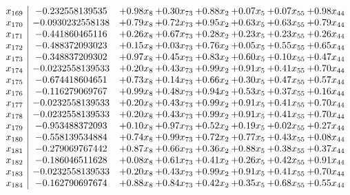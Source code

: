 \documentclass[8pt]{article}
\begin{document}
\[\begin{array}{c| c c@{\hskip 2pt} c@{\hskip 2pt} c@{\hskip 2pt} c@{\hskip 2pt} c@{\hskip 2pt} c@{\hskip 2pt} }
 x_{169}   &  -0.232558139535 & +  0.98 x_{8} & +  0.30 x_{73} & +  0.88 x_{2} & +  0.07 x_{5} & +  0.07 x_{55} & +  0.98 x_{44}\\
 x_{170}   &  -0.0930232558138 & +  0.79 x_{8} & +  0.72 x_{73} & +  0.95 x_{2} & +  0.63 x_{5} & +  0.63 x_{55} & +  0.79 x_{44}\\
 x_{171}   &  -0.441860465116 & +  0.26 x_{8} & +  0.67 x_{73} & +  0.28 x_{2} & +  0.23 x_{5} & +  0.23 x_{55} & +  0.26 x_{44}\\
 x_{172}   &  -0.488372093023 & +  0.15 x_{8} & +  0.03 x_{73} & +  0.76 x_{2} & +  0.05 x_{5} & +  0.55 x_{55} & +  0.65 x_{44}\\
 x_{173}   &  -0.348837209302 & +  0.97 x_{8} & +  0.45 x_{73} & +  0.83 x_{2} & +  0.60 x_{5} & +  0.10 x_{55} & +  0.47 x_{44}\\
 x_{174}   &  -0.0232558139533 & +  0.20 x_{8} & +  0.43 x_{73} & +  0.99 x_{2} & +  0.91 x_{5} & +  0.41 x_{55} & +  0.70 x_{44}\\
 x_{175}   &  -0.674418604651 & +  0.73 x_{8} & +  0.14 x_{73} & +  0.66 x_{2} & +  0.30 x_{5} & +  0.47 x_{55} & +  0.57 x_{44}\\
 x_{176}   &  -0.116279069767 & +  0.99 x_{8} & +  0.48 x_{73} & +  0.94 x_{2} & +  0.53 x_{5} & +  0.37 x_{55} & +  0.16 x_{44}\\
 x_{177}   &  -0.0232558139533 & +  0.20 x_{8} & +  0.43 x_{73} & +  0.99 x_{2} & +  0.91 x_{5} & +  0.41 x_{55} & +  0.70 x_{44}\\
 x_{178}   &  -0.0232558139533 & +  0.20 x_{8} & +  0.43 x_{73} & +  0.99 x_{2} & +  0.91 x_{5} & +  0.41 x_{55} & +  0.70 x_{44}\\
 x_{179}   &  -0.953488372093 & +  0.10 x_{8} & +  0.97 x_{73} & +  0.52 x_{2} & +  0.19 x_{5} & +  0.02 x_{55} & +  0.27 x_{44}\\
 x_{180}   &  -0.558139534884 & +  0.74 x_{8} & +  0.99 x_{73} & +  0.72 x_{2} & +  0.77 x_{5} & +  0.43 x_{55} & +  0.08 x_{44}\\
 x_{181}   &  -0.279069767442 & +  0.87 x_{8} & +  0.66 x_{73} & +  0.36 x_{2} & +  0.88 x_{5} & +  0.38 x_{55} & +  0.37 x_{44}\\
 x_{182}   &  -0.186046511628 & +  0.08 x_{8} & +  0.61 x_{73} & +  0.41 x_{2} & +  0.26 x_{5} & +  0.42 x_{55} & +  0.91 x_{44}\\
 x_{183}   &  -0.0232558139533 & +  0.20 x_{8} & +  0.43 x_{73} & +  0.99 x_{2} & +  0.91 x_{5} & +  0.41 x_{55} & +  0.70 x_{44}\\
 x_{184}   &  -0.162790697674 & +  0.88 x_{8} & +  0.84 x_{73} & +  0.42 x_{2} & +  0.35 x_{5} & +  0.68 x_{55} & +  0.55 x_{44}\\

\end{array}\]
\end{document}
